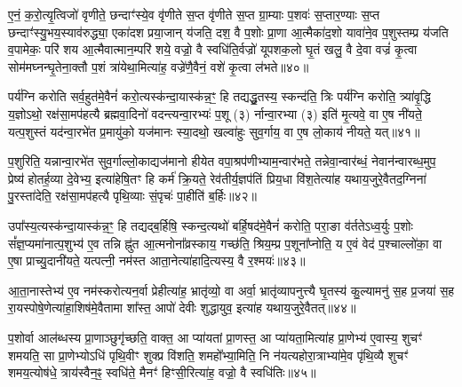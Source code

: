 ए॒नं॒ क॒रो॒त्यृ॒त्विजो॑ वृणीते॒ छन्दाꣳ॑स्ये॒व वृ॑णीते स॒प्त वृ॑णीते स॒प्त ग्रा॒म्याः प॒शवः॑ स॒प्तार॒ण्याः स॒प्त छन्दाꣳ॑स्यु॒भय॒स्याव॑रुद्ध्या॒ एका॑दश प्रया॒जान् य॑जति॒ दश॒ वै प॒शोः प्रा॒णा आ॒त्मैका॑द॒शो यावा॑ने॒व प॒शुस्तम्प्र य॑जति व॒पामेकः॒ परि॑ शय आ॒त्मैवात्मान॒म्परि॑ शये॒ वज्रो॒ वै स्वधि॑ति॒र्वज्रो॑ यूपशक॒लो घृ॒तं खलु॒ वै दे॒वा वज्रं॑ कृ॒त्वा सोम॑मघ्नन्घृ॒तेना॒क्तौ प॒शं त्रा॑येथा॒मित्या॑ह॒ वज्रे॑णै॒वैनं॒ वशे॑ कृ॒त्वा ल॑भते॥४०॥

{\anuvakamend[{आ॒घा॒रम्प॑द्यन्ते॒ द्वाद॑शा॒त्मन्ने॒व य॒ज्ञस्य॒ मेध्य॑मे॒व खलु॒ वा अ॒ष्टाद॑श च॥७॥}]}

पर्य॑ग्नि करोति सर्व॒हुत॑मे॒वैनं॑ करो॒त्यस्क॑न्दा॒यास्क॑न्न॒ꣳ॒ हि तद्यद्धु॒तस्य॒ स्कन्द॑ति॒ त्रिः पर्य॑ग्नि करोति॒ त्र्या॑वृ॒द्धि य॒ज्ञो\-ऽथो॒ रक्ष॑सा॒मप॑हत्यै ब्रह्मवा॒दिनो॑ वदन्त्यन्वा॒रभ्यः॑ प॒शू (३) र्नान्वा॒रभ्या (३) इति॑ मृ॒त्यवे॒ वा ए॒ष नी॑यते॒ यत्प॒शुस्तं यद॑न्वा॒रभे॑त प्र॒मायु॑को॒ यज॑मानः स्या॒दथो॒ खल्वा॑हुः सुव॒र्गाय॒ वा ए॒ष लो॒काय॑ नीयते॒ यत्॥४१॥

प॒शुरिति॒ यन्नान्वा॒रभे॑त सुव॒र्गाल्लो॒काद्यज॑मानो हीयेत वपा॒श्रप॑णीभ्याम॒न्वार॑भते॒ तन्नेवा॒न्वार॑ब्धं॒ नेवान॑न्वारब्ध॒मुप॒ प्रेष्य॑ होतर्\mbox{}ह॒व्या दे॒वेभ्य॒ इत्या॑हेषि॒तꣳ हि कर्म॑ क्रि॒यते॒ रेव॑तीर्य॒ज्ञप॑तिं प्रिय॒धा वि॑श॒तेत्या॑ह यथाय॒जुरे॒वैतद॒ग्निना॑ पु॒रस्ता॑देति॒ रक्ष॑सा॒मप॑हत्यै पृथि॒व्याः सं॒पृचः॑ पा॒हीति॑ ब॒र्\mbox{}हिः॥४२॥

उपा᳚स्य॒त्यस्क॑न्दा॒यास्क॑न्न॒ꣳ॒ हि तद्यद्ब॒र्\mbox{}हिषि॒ स्कन्द॒त्यथो॑ बर्\mbox{}हि॒षद॑मे॒वैनं॑ करोति॒ परा॒ङा व॑र्तते\-ऽध्व॒र्युः प॒शोः सं᳚ज्ञ॒प्यमा॑नात्प॒शुभ्य॑ ए॒व तन्नि ह्नु॑त आ॒त्मनोना᳚व्रस्काय॒ गच्छ॑ति॒ श्रिय॒म्प्र प॒शूना᳚प्नोति॒ य ए॒वं वेद॑ प॒श्चाल्लो॑का॒ वा ए॒षा प्राच्यु॒दानी॑यते॒ यत्पत्नी॒ नम॑स्त आता॒नेत्या॑हादि॒त्यस्य॒ वै र॒श्मयः॑॥४३॥

आ॒ता॒नास्तेभ्य॑ ए॒व नम॑स्करोत्यन॒र्वा प्रेहीत्या॑ह॒ भ्रातृ॑व्यो॒ वा अर्वा॒ भ्रातृ॑व्यापनुत्त्यै घृ॒तस्य॑ कु॒ल्यामनु॑ स॒ह प्र॒जया॑ स॒ह रा॒यस्पोषे॒णेत्या॑हा॒शिष॑मे॒वैतामा शा᳚स्त॒ आपो॑ देवीः शुद्धायुव॒ इत्या॑ह यथाय॒जुरे॒वैतत्॥४४॥

{\anuvakamend[{लो॒काय॑ नीयते॒ यद्ब॒र्\mbox{}ही र॒श्मयः॑ स॒प्तत्रिꣳ॑शच्च॥८॥}]}

प॒शोर्वा आल॑ब्धस्य प्रा॒णाञ्छुगृ॑च्छति॒ वाक्त॒ आ प्या॑यतां प्रा॒णस्त॒ आ प्या॑यता॒मित्या॑ह प्रा॒णेभ्य॑ ए॒वास्य॒ शुचꣳ॑ शमयति॒ सा प्रा॒णेभ्यो\-ऽधि॑ पृथि॒वीꣳ शुक्प्र वि॑शति॒ शमहो᳚भ्या॒मिति॒ नि न॑यत्यहोरा॒त्राभ्या॑मे॒व पृ॑थि॒व्यै शुचꣳ॑ शमय॒त्योष॑धे॒ त्राय॑स्वैन॒ꣴ॒ स्वधि॑ते॒ मैनꣳ॑ हिꣳसी॒रित्या॑ह॒ वज्रो॒ वै स्वधि॑तिः॥४५॥

